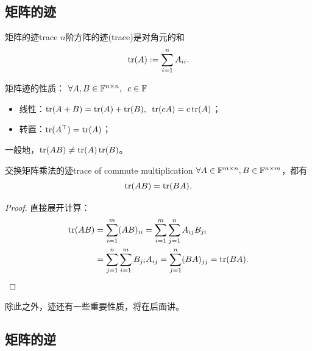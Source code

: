 \subsection{矩阵的迹}

\begin{definition}{矩阵的迹}{trace}
	$n$阶方阵的迹(trace)是对角元的和
	\begin{equation}
		\operatorname{tr}(A) := \sum_{i=1}^nA_{ii}.
	\end{equation}
\end{definition}
\begin{corollary}
	矩阵迹的性质：%
	$\forall A,B \in \mathbb{F}^{n\times n},\enspace c \in \mathbb{F}$
    \begin{itemize}
        \item 线性：$\operatorname{tr}(A + B) = \operatorname{tr}(A) + \operatorname{tr}(B),\enspace \operatorname{tr}(cA) = c\operatorname{tr}(A)$；
        \item 转置：$\operatorname{tr}(A^\top) = \operatorname{tr}(A)$；
    \end{itemize}
\end{corollary}
\begin{remark}
	一般地，$\operatorname{tr}(AB) \neq \operatorname{tr}(A)\operatorname{tr}(B)$。
\end{remark}
\begin{theorem}{交换矩阵乘法的迹}{trace of commute multiplication}
	$\forall A \in \mathbb{F}^{m\times n},B \in \mathbb{F}^{n\times m}$，都有
	\begin{equation}
		\operatorname{tr}(AB) = \operatorname{tr}(BA).
	\end{equation}
\end{theorem}
\begin{proof}
	直接展开计算：
	\begin{align*}
		\operatorname{tr}(AB) &= \sum_{i=1}^m(AB)_{ii} = \sum_{i=1}^m\sum_{j=1}^nA_{ij}B_{ji}\\
		&= \sum_{j=1}^n\sum_{i=1}^mB_{ji}A_{ij} = \sum_{j=1}^n(BA)_{jj} = \operatorname{tr}(BA).
		\qedhere
	\end{align*}
\end{proof}

\begin{remark}
	除此之外，迹还有一些重要性质，将在后面讲。
\end{remark}

\subsection{矩阵的逆}

